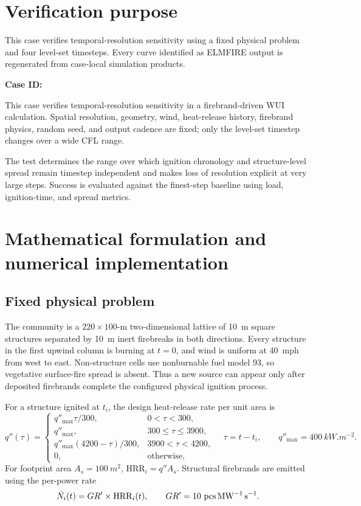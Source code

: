 \section{Verification purpose}
This case verifies temporal-resolution sensitivity using a fixed physical
problem and four level-set timesteps. Every curve identified as ELMFIRE output
is regenerated from case-local simulation products.

\textbf{Case ID:} \CaseID

This case verifies temporal-resolution sensitivity in a firebrand-driven WUI calculation. Spatial resolution, geometry, wind, heat-release history, firebrand physics, random seed, and output cadence are fixed; only the level-set timestep changes over a wide CFL range.

The test determines the range over which ignition chronology and structure-level spread remain timestep independent and makes loss of resolution explicit at very large steps. Success is evaluated against the finest-step baseline using load, ignition-time, and spread metrics.

\section{Mathematical formulation and numerical implementation}

\subsection{Fixed physical problem}

The community is a \(220\times100\)-m two-dimensional lattice of
\SI{10}{m} square structures separated by \SI{10}{m} inert firebreaks in both
directions. Every structure in the first upwind column is burning at \(t=0\), and wind is uniform at
\SI{40}{mph} from west to east. Non-structure cells use nonburnable fuel model
93, so vegetative surface-fire spread is absent. Thus a
new source can appear only after deposited firebrands complete the configured
physical ignition process.

For a structure ignited at \(t_i\), the design heat-release rate per unit area is
\[
q''(\tau)=
\begin{cases}
q''_{\max}\tau/300,&0<\tau<300,\\
q''_{\max},&300\le\tau\le3900,\\
q''_{\max}(4200-\tau)/300,&3900<\tau<4200,\\
0,&\text{otherwise},
\end{cases}
\quad \tau=t-t_i,\qquad q''_{\max}=\SI{400}{kW.m^{-2}}.
\]
For footprint area \(A_s=\SI{100}{m^2}\),
\(\mathrm{HRR}_i=q''A_s\). Structural firebrands are emitted using the per-power rate
\[
\dot N_i(t)=GR'\times{\mathrm{HRR}_i(t)},\qquad
GR'=\SI{10}\,\rm{pcs\, MW^{-1}\,s^{-1}}.
\]


